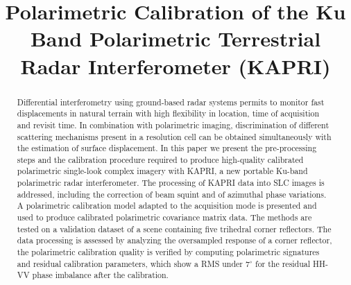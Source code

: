 \documentclass[journal, 10pt, final,letterpaper,]{IEEEtran}
\title{Polarimetric Calibration of the Ku Band Polarimetric Terrestrial Radar Interferometer (KAPRI)}
\author{\IEEEauthorblockN{
	Simone Baffelli,~\IEEEmembership{Student Member,~IEEE},
	Othmar Frey,~\IEEEmembership{Senior Member,~IEEE},
	Charles Werner~\IEEEmembership{Senior Member,~IEEE}, and
	Irena Hajnsek,~\IEEEmembership{Fellow,~IEEE}
}}
\begin{document}
\maketitle
\begin{abstract}
Differential interferometry using ground-based radar systems permits to monitor fast displacements in natural terrain with  high flexibility in location, time of acquisition and revisit time. In combination with polarimetric imaging, discrimination of different scattering mechanisms present in a resolution cell can be obtained simultaneously with the estimation of surface displacement.
In this paper we present the pre-processing steps and the calibration procedure required to produce high-quality calibrated polarimetric single-look complex imagery with KAPRI, a new portable Ku-band polarimetric radar interferometer. The processing of KAPRI data into SLC images is addressed, including the correction of beam squint and of azimuthal phase variations. A polarimetric calibration model adapted to the acquisition mode is presented and used to produce calibrated polarimetric covariance matrix data. The methods are tested on a validation dataset of a scene containing five trihedral corner reflectors. The data processing is assessed by analyzing the oversampled response of a corner reflector, the polarimetric calibration quality is verified by computing polarimetric signatures and residual calibration parameters, which show a RMS under $\mathrm{7^\circ}$ for the residual HH-VV phase imbalance after the calibration.
\end{abstract}





\pagebreak



\end{document}
